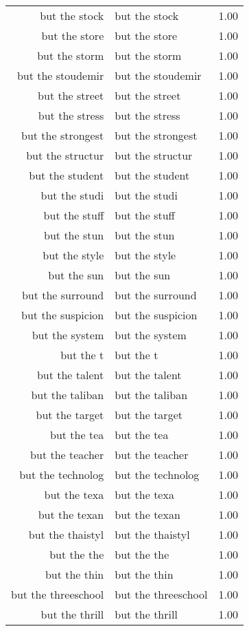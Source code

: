 \begin{table}[ht]
\begin{tabular}{rlr}
  but the stock & but the stock & 1.00 \\ 
  but the store & but the store & 1.00 \\ 
  but the storm & but the storm & 1.00 \\ 
  but the stoudemir & but the stoudemir & 1.00 \\ 
  but the street & but the street & 1.00 \\ 
  but the stress & but the stress & 1.00 \\ 
  but the strongest & but the strongest & 1.00 \\ 
  but the structur & but the structur & 1.00 \\ 
  but the student & but the student & 1.00 \\ 
  but the studi & but the studi & 1.00 \\ 
  but the stuff & but the stuff & 1.00 \\ 
  but the stun & but the stun & 1.00 \\ 
  but the style & but the style & 1.00 \\ 
  but the sun & but the sun & 1.00 \\ 
  but the surround & but the surround & 1.00 \\ 
  but the suspicion & but the suspicion & 1.00 \\ 
  but the system & but the system & 1.00 \\ 
  but the t & but the t & 1.00 \\ 
  but the talent & but the talent & 1.00 \\ 
  but the taliban & but the taliban & 1.00 \\ 
  but the target & but the target & 1.00 \\ 
  but the tea & but the tea & 1.00 \\ 
  but the teacher & but the teacher & 1.00 \\ 
  but the technolog & but the technolog & 1.00 \\ 
  but the texa & but the texa & 1.00 \\ 
  but the texan & but the texan & 1.00 \\ 
  but the thaistyl & but the thaistyl & 1.00 \\ 
  but the the & but the the & 1.00 \\ 
  but the thin & but the thin & 1.00 \\ 
  but the threeschool & but the threeschool & 1.00 \\ 
  but the thrill & but the thrill & 1.00 \\ 

\end{tabular}
\end{table}
